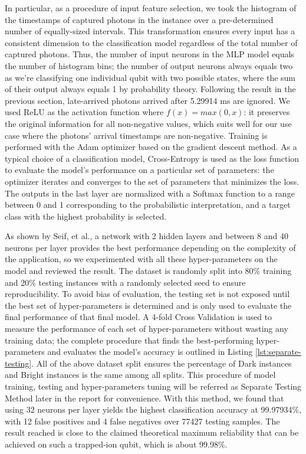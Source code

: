 \documentclass[letterpaper,twocolumn,10pt]{article}
\begin{document}
In particular, as a procedure of input feature selection, we took the histogram of the timestamps of captured photons in the instance over a pre-determined number of equally-sized intervals. This transformation ensures every input has a consistent dimension to the classification model regardless of the total number of captured photons. Thus, the number of input neurons in the MLP model equals the number of histogram bins; the number of output neurons always equals two as we're classifying one individual qubit with two possible states, where the sum of their output always equals 1 by probability theory. Following the result in the previous section, late-arrived photons arrived after 5.29914 ms are ignored. We used ReLU as the activation function where $f(x) = max(0, x)$: it preserves the original information for all non-negative values, which suits well for our use case where the photons' arrival timestamps are non-negative. Training is performed with the Adam optimizer based on the gradient descent method. As a typical choice of a classification model, Cross-Entropy is used as the loss function to evaluate the model's performance on a particular set of parameters: the optimizer iterates and converges to the set of parameters that minimizes the loss. The outputs in the last layer are normalized with a Softmax function to a range between 0 and 1 corresponding to the probabilistic interpretation, and a target class with the highest probability is selected.

As shown by Seif, et al., a network with 2 hidden layers and between 8 and 40 neurons per layer provides the best performance depending on the complexity of the application, so we experimented with all these hyper-parameters on the model and reviewed the result. The dataset is randomly split into 80\% training and 20\% testing instances with a randomly selected seed to ensure reproducibility. To avoid bias of evaluation, the testing set is not exposed until the best set of hyper-parameters is determined and is only used to evaluate the final performance of that final model. A 4-fold Cross Validation is used to measure the performance of each set of hyper-parameters without wasting any training data; the complete procedure that finds the best-performing hyper-parameters and evaluates the model's accuracy is outlined in Listing \ref{lst:separate-testing}. All of the above dataset split ensures the percentage of Dark instances and Bright instances is the same among all splits. This procedure of model training, testing and hyper-parameters tuning will be referred as Separate Testing Method later in the report for convenience. With this method, we found that using 32 neurons per layer yields the highest classification accuracy at 99.97934\%, with 12 false positives and 4 false negatives over 77427 testing samples. The result reached is close to the claimed theoretical maximum reliability that can be achieved on such a trapped-ion qubit, which is about 99.98\%.
\end{document}
